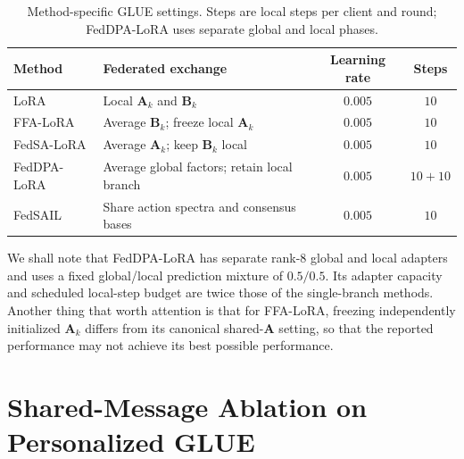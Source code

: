 \documentclass[11pt,letterpaper]{article}
\newcommand{\bA}{\mathbf{A}}
\newcommand{\bB}{\mathbf{B}}
\begin{document}
\begin{table}[!htbp]
    \centering
    \caption{Method-specific GLUE settings. Steps are local steps per client
    and round; FedDPA-LoRA uses separate global and local phases.}
    \label{tab:glue-method-protocol}
    \small
    \setlength{\tabcolsep}{4pt}
    \renewcommand{\arraystretch}{1.08}
    \begin{tabular*}{\linewidth}{@{\extracolsep{\fill}}llcc@{}}
        \toprule
        Method & Federated exchange & Learning rate & Steps \\
        \midrule
        LoRA & Local $\bA_k$ and $\bB_k$ & $0.005$ & $10$ \\
        FFA-LoRA & Average $\bB_k$; freeze local $\bA_k$ & $0.005$ & $10$ \\
        FedSA-LoRA & Average $\bA_k$; keep $\bB_k$ local & $0.005$ & $10$ \\
        FedDPA-LoRA & Average global factors; retain local branch & $0.005$ & $10+10$ \\
        FedSAIL & Share action spectra and consensus bases & $0.005$ & $10$ \\
        \bottomrule
    \end{tabular*}
\end{table}

We shall note that FedDPA-LoRA has separate rank-$8$ global and local adapters and uses a fixed
global/local prediction mixture of $0.5/0.5$. Its adapter capacity and
scheduled local-step budget are twice those of the single-branch methods.
Another thing that worth attention is that for FFA-LoRA, freezing independently initialized $\bA_k$ differs from its
canonical shared-$\bA$ setting, so that the reported performance may not achieve its best possible performance. 


\FloatBarrier

\section{Shared-Message Ablation on Personalized GLUE}
\label{app:core-ablation}
\end{document}
